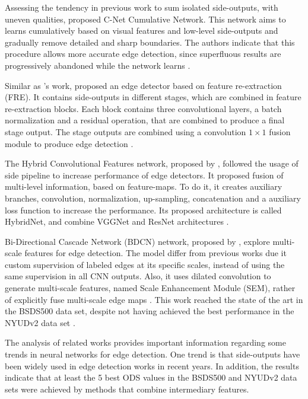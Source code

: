 Assessing the tendency in previous work to sum isolated side-outputs, with uneven qualities, \cite{Cumulative:Song20181847} proposed C-Net Cumulative Network.
This network aims to learns cumulatively based on visual features and low-level side-outputs and gradually remove detailed and sharp boundaries.
The authors indicate that this procedure allows more accurate edge detection, since superfluous results are progressively abandoned while the network learns \cite{Cumulative:Song20181847}.

Similar as \cite{Cumulative:Song20181847}'s work, \cite{ReExtraction:Wen201884} proposed an edge detector based on feature re-extraction (FRE).
It contains side-outputs in different stages, which are combined in feature re-extraction blocks.
Each block contains three convolutional layers, a batch normalization and a residual operation, that are combined to produce a final stage output.
The stage outputs are combined using a convolution $1 \times 1$ fusion module to produce edge detection \cite{ReExtraction:Wen201884}.

The Hybrid Convolutional Features network, proposed by \cite{LearningHybrid:Hu2018377}, followed the usage of side pipeline to increase performance of edge detectors.
It proposed fusion of multi-level information, based on feature-maps.
To do it, it creates auxiliary branches, convolution, normalization, up-sampling, concatenation and a auxiliary loss function to increase the performance.
Its proposed architecture is called HybridNet, and combine VGGNet and ResNet architectures \cite{LearningHybrid:Hu2018377}. 

Bi-Directional Cascade Network (BDCN) network, proposed by \cite{He:2019}, explore multi-scale features for edge detection.
The model differ from previous works due it custom supervision of labeled edges at its specific scales, instead of using the same supervision in all CNN outputs.
Also, it uses dilated convolution to generate multi-scale features, named Scale Enhancement Module (SEM), rather of explicitly fuse multi-scale edge maps \cite{He:2019}.
This work reached the state of the art in the BSDS500 data set, despite not having achieved the best performance in the NYUDv2 data set \cite{Silberman:ECCV12}. %

%

The analysis of related works provides important information regarding some trends in neural networks for edge detection.
One trend is that side-outputs have been widely used in edge detection works in recent years.
In addition, the results indicate that at least the 5 best ODS values in the BSDS500 and NYUDv2 data sets were achieved by methods that combine intermediary features.

